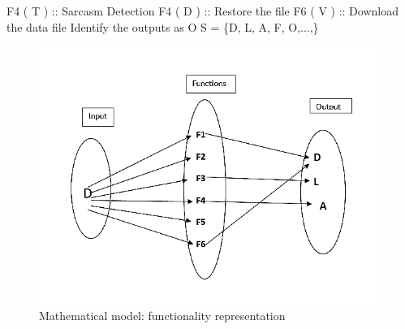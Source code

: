 \documentclass[oneside,a4paper,12pt]{book}
\begin{document}
F4 ( T ) :: Sarcasm Detection\newline
F4 ( D ) :: Restore the file\newline
F6 ( V ) :: Download the data file\newline
Identify the outputs as O\newline
S = \{D, L, A, F, O,...,\}\newline
\begin{figure}[h!]
  \centering
  \includegraphics[width=\linewidth]{math.png}
  \caption{Mathematical model: functionality representation}
\end{figure}
\newpage
\end{document}
